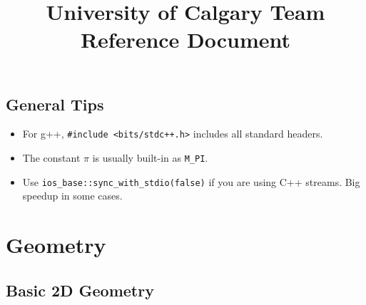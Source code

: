 \documentclass[letterpaper]{article}
\begin{document}
\title{University of Calgary Team Reference Document}
\maketitle
\thispagestyle{myheadings}

\begin{multicols*}{2}

\tableofcontents

\section{General Tips}
\begin{itemize}
\item For g++, \texttt{\#include <bits/stdc++.h>} includes all standard headers.
\item The constant $\pi$ is usually built-in as \texttt{M\_PI}.
\item Use \texttt{ios\_base::sync\_with\_stdio(false)} if you are using C++ streams. Big speedup in some cases.
\end{itemize}

\end{multicols*}

\section{Geometry}

\subsection{Basic 2D Geometry}
\end{document}
